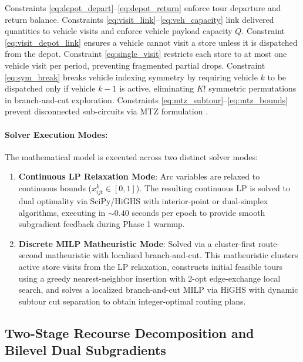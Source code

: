 \documentclass[11pt,a4paper]{article}
\theoremstyle{definition}
\theoremstyle{remark}
\begin{document}
Constraints \eqref{eq:depot_depart}--\eqref{eq:depot_return} enforce tour departure and return balance. Constraints \eqref{eq:visit_link}--\eqref{eq:veh_capacity} link delivered quantities to vehicle visits and enforce vehicle payload capacity $Q$. Constraint \eqref{eq:visit_depot_link} ensures a vehicle cannot visit a store unless it is dispatched from the depot. Constraint \eqref{eq:single_visit} restricts each store to at most one vehicle visit per period, preventing fragmented partial drops. Constraint \eqref{eq:sym_break} breaks vehicle indexing symmetry by requiring vehicle $k$ to be dispatched only if vehicle $k-1$ is active, eliminating $K!$ symmetric permutations in branch-and-cut exploration. Constraints \eqref{eq:mtz_subtour}--\eqref{eq:mtz_bounds} prevent disconnected sub-circuits via MTZ formulation \citep{miller1960integer}.

\paragraph{Solver Execution Modes:}
The mathematical model is executed across two distinct solver modes:
\begin{enumerate}[label=(\roman*)]
    \item \textbf{Continuous LP Relaxation Mode}: Arc variables are relaxed to continuous bounds ($x_{ijt}^k \in [0, 1]$). The resulting continuous LP is solved to dual optimality via SciPy/HiGHS with interior-point or dual-simplex algorithms, executing in $\sim 0.40$ seconds per epoch to provide smooth subgradient feedback during Phase 1 warmup.
    \item \textbf{Discrete MILP Matheuristic Mode}: Solved via a cluster-first route-second matheuristic with localized branch-and-cut. This matheuristic clusters active store visits from the LP relaxation, constructs initial feasible tours using a greedy nearest-neighbor insertion with 2-opt edge-exchange local search, and solves a localized branch-and-cut MILP via HiGHS with dynamic subtour cut separation to obtain integer-optimal routing plans.
\end{enumerate}

\subsection{Two-Stage Recourse Decomposition and Bilevel Dual Subgradients}
\label{sec:recourse_decomposition}
\label{sec:bilevel_recourse}
\end{document}
